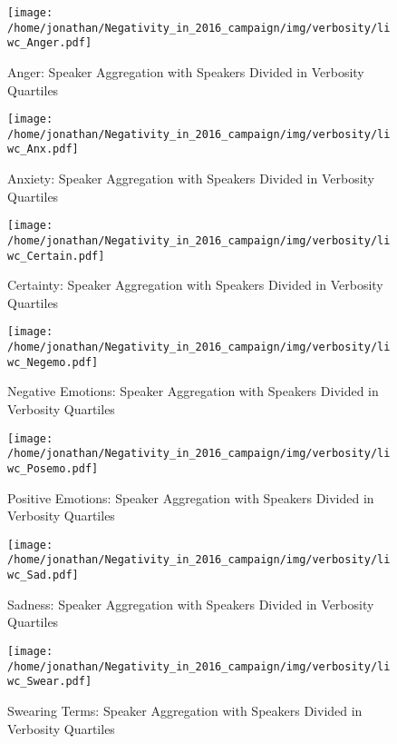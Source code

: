 \begin{figure}[h]\centering
	\texttt{[image: /home/jonathan/Negativity\_in\_2016\_campaign/img/verbosity/liwc\_Anger.pdf]}
	\caption{Anger: Speaker Aggregation with Speakers Divided in Verbosity Quartiles}
	\label{fig: verbosity_Anger}
\end{figure}

\begin{figure}[h]\centering
	\texttt{[image: /home/jonathan/Negativity\_in\_2016\_campaign/img/verbosity/liwc\_Anx.pdf]}
	\caption{Anxiety: Speaker Aggregation with Speakers Divided in Verbosity Quartiles}
	\label{fig: verbosity_Anxiety}
\end{figure}

\begin{figure}[h]\centering
	\texttt{[image: /home/jonathan/Negativity\_in\_2016\_campaign/img/verbosity/liwc\_Certain.pdf]}
	\caption{Certainty: Speaker Aggregation with Speakers Divided in Verbosity Quartiles}
	\label{fig: verbosity_Certainty}
\end{figure}

\begin{figure}[h]\centering
	\texttt{[image: /home/jonathan/Negativity\_in\_2016\_campaign/img/verbosity/liwc\_Negemo.pdf]}
	\caption{Negative Emotions: Speaker Aggregation with Speakers Divided in Verbosity Quartiles}
	\label{fig: verbosity_Negative Emotions}
\end{figure}

\begin{figure}[h]\centering
	\texttt{[image: /home/jonathan/Negativity\_in\_2016\_campaign/img/verbosity/liwc\_Posemo.pdf]}
	\caption{Positive Emotions: Speaker Aggregation with Speakers Divided in Verbosity Quartiles}
	\label{fig: verbosity_Positive Emotions}
\end{figure}

\begin{figure}[h]\centering
	\texttt{[image: /home/jonathan/Negativity\_in\_2016\_campaign/img/verbosity/liwc\_Sad.pdf]}
	\caption{Sadness: Speaker Aggregation with Speakers Divided in Verbosity Quartiles}
	\label{fig: verbosity_Sadness}
\end{figure}

\begin{figure}[h]\centering
	\texttt{[image: /home/jonathan/Negativity\_in\_2016\_campaign/img/verbosity/liwc\_Swear.pdf]}
	\caption{Swearing Terms: Speaker Aggregation with Speakers Divided in Verbosity Quartiles}
	\label{fig: verbosity_Swearing Terms}
\end{figure}

